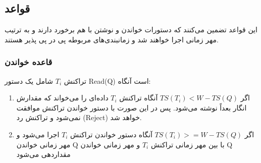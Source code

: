 \documentclass[a4paper]{article}
\begin{document}
\subsection{قواعد}

این قواعد تضمین می‌کنند که دستورات خواندن و نوشتن با هم برخورد دارند و به ترتیب
مهر زمانی اجرا خواهند شد و زمانبندی‌های مربوطه پی در پی پذیر هستند.

\subsubsection{قاعده خواندن}

تراکنش $T_i$ شامل یک دستور Read(Q) است آنگاه:

\begin{enumerate}
    \item اگر $TS(T_i) < W-TS(Q)$ آنگاه تراکنش $T_i$ داده‌ای را می‌خواند که
    مقدارش انگار بعداً نوشته می‌شود. پس در این صورت با دستور خواندن تراکنش
    موافقت نمی‌شود و تراکنش رد (Reject) خواهد شد.
    \begin{LTR}
        \begin{table}[h]
            \begin{RTL}
                \caption{بررسی مهر زمانی در قاعده خواندن}
            \end{RTL}
            \centering
        \end{table}
    \end{LTR}

    \item اگر $TS(T_i) >= W-TS(Q)$ آنگاه دستور خواندن تراکنش $T_i$ اجرا می‌شود و
    مهر زمانی خواندن Q با  بین مهر زمانی تراکنش $T_i$ و مهر زمانی خواندن
    Q مقداردهی می‌شود

    \begin{LTR}
        \begin{table}[h]
            \begin{RTL}
                \caption{بررسی مهر زمانی در قاعده خواندن}
            \end{RTL}
            \centering
        \end{table}
    \end{LTR}

\end{enumerate}
\end{document}

